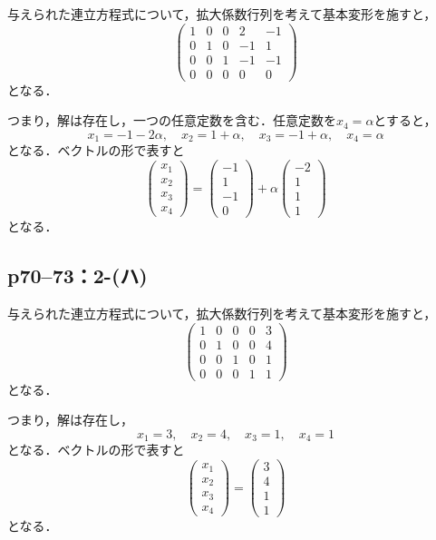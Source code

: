 \documentclass[a4paper,10pt,fleqn]{ltjsarticle}
\begin{document}
\begin{tleftbar}
    与えられた連立方程式について，拡大係数行列を考えて基本変形を施すと，
    \[
        \begin{pmatrix} 1 & 0 & 0  & 2 & -1 \\ 0 & 1& 0  & -1 & 1 \\ 0 & 0 & 1 & -1 & -1 \\ 0 & 0 & 0 & 0 & 0 \end{pmatrix}
    \]
    となる．

    つまり，解は存在し，一つの任意定数を含む．任意定数を$x_4 = \alpha$とすると，
    \[
        x_1 = -1 -2\alpha   , \quad x_2 =1+\alpha  , \quad x_3 =-1+ \alpha  , \quad x_4 = \alpha
    \]
    となる．ベクトルの形で表すと
    \[
        \begin{pmatrix} x_1 \\ x_2 \\ x_3 \\ x_4  \end{pmatrix}= \begin{pmatrix} -1 \\ 1 \\ -1 \\ 0 \end{pmatrix} +\alpha \begin{pmatrix} -2 \\ 1\\ 1 \\ 1\end{pmatrix}
    \]
    となる．
\end{tleftbar}

\newpage

\subsection*{p70--73：2-(ハ)}

\begin{tleftbar}
    与えられた連立方程式について，拡大係数行列を考えて基本変形を施すと，
    \[
        \begin{pmatrix} 1 & 0 & 0  & 0 & 3 \\ 0 & 1& 0  & 0 & 4 \\ 0 & 0 & 1 & 0 & 1 \\ 0 & 0 & 0 & 1 & 1 \end{pmatrix}
    \]
    となる．

    つまり，解は存在し，
    \[
        x_1 = 3 , \quad x_2 =4 , \quad x_3 = 1 , \quad x_4 = 1
    \]
    となる．ベクトルの形で表すと
    \[
        \begin{pmatrix} x_1 \\ x_2 \\ x_3 \\ x_4 \end{pmatrix}= \begin{pmatrix} 3 \\ 4 \\ 1 \\ 1 \end{pmatrix}
    \]
    となる．
\end{tleftbar}
\end{document}
